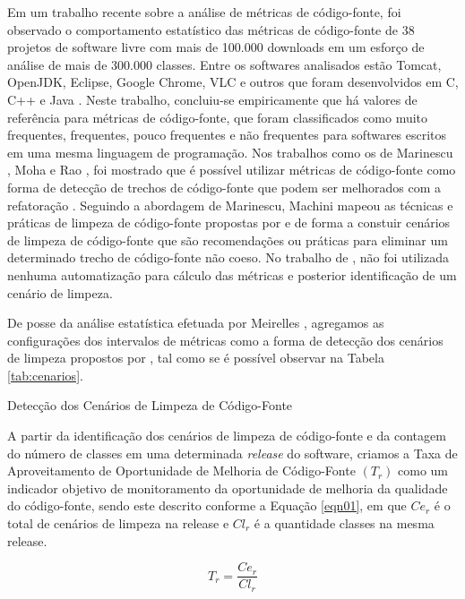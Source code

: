 Em um trabalho recente sobre a análise de métricas de código-fonte, foi observado o comportamento estatístico das métricas de código-fonte de 38 projetos de software livre com mais de 100.000 downloads em um esforço de análise de mais de 300.000 classes. Entre os softwares analisados estão Tomcat, OpenJDK, Eclipse, Google Chrome, VLC e outros que foram desenvolvidos em C, C++ e Java \cite{Meirelles2013}. Neste trabalho, concluiu-se empiricamente que há valores de referência para métricas de código-fonte, que foram classificados como muito frequentes, frequentes, pouco frequentes e não frequentes para softwares escritos em uma mesma linguagem de programação. Nos trabalhos como os de Marinescu \cite{marinescu2005measurement}, Moha \cite{moha2010decor} e Rao \cite{rao2007detecting}, foi mostrado que é possível utilizar métricas de código-fonte como forma de detecção de trechos de código-fonte que podem ser melhorados com a refatoração \cite{fowler1999refactoring}. Seguindo a abordagem de Marinescu, Machini \cite{Machini2010} mapeou as técnicas e práticas de limpeza de código-fonte propostas por \cite{Martin2008} e \cite{beck2007implementation} de forma a constuir cenários de limpeza de código-fonte que são recomendações ou práticas para eliminar um determinado trecho de código-fonte não coeso. No trabalho de \cite{Machini2010}, não foi utilizada nenhuma automatização para cálculo das métricas e posterior identificação de um cenário de limpeza.

De posse da análise estatística efetuada por Meirelles \cite{Meirelles2013}, agregamos as configurações dos intervalos de métricas como a forma de detecção dos cenários de limpeza propostos por \cite{Machini2010}, tal como se é possível observar na Tabela \ref{tab:cenarios}.
	
	\begin{table}[ht]
	\centering
	\caption{Detecção dos Cenários de Limpeza de Código-Fonte}
	\addtolength{\belowcaptionskip}{6pt}
		
	\label{tab:cenarios}
	\end{table}
	\FloatBarrier


A partir da identificação dos cenários de limpeza de código-fonte e da contagem do número de classes em uma determinada \textit{release} do software, criamos a Taxa de Aproveitamento de Oportunidade de Melhoria de Código-Fonte $(T_r)$ como um indicador objetivo de monitoramento da oportunidade de melhoria da qualidade do código-fonte, sendo este descrito conforme a Equação \ref{eqn01}, em que $ Ce_r $ é o total de cenários de limpeza na release e $ Cl_r $ é a quantidade classes na mesma release.

\begin{equation}
\label{eqn01}
T_r =   \frac{{{Ce_r}}}{{Cl_r}}
\end{equation}
